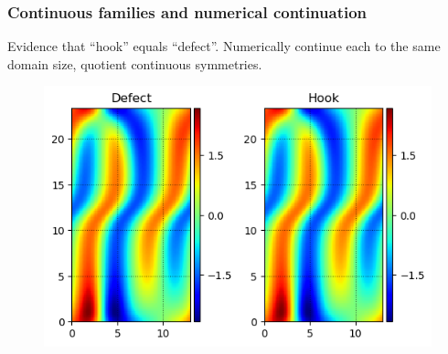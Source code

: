 \documentclass[mathserif, handout]{beamer}
\begin{document}
\begin{frame}%
  \frametitle{Continuous families and numerical continuation}
  Evidence that ``hook'' equals ``defect''. Numerically continue
  each to the same domain size, quotient continuous symmetries.
  \begin{figure}
  \includegraphics[width=.4\textwidth]{MNG_hookdefect_comparison}
  \end{figure}
\end{frame}


\end{document}
